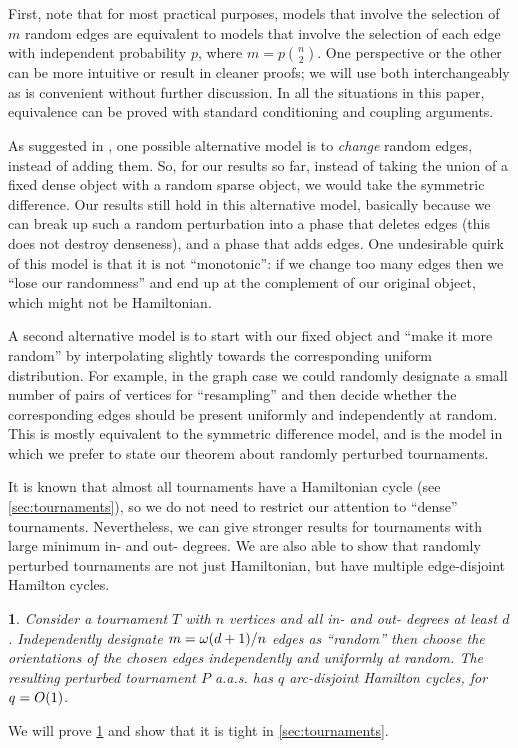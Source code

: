 \documentclass[11pt,english]{article}
\theoremstyle{plain}
\newtheorem{thm}{\protect\theoremname}
\theoremstyle{definition}
\theoremstyle{definition}
\theoremstyle{plain}
\theoremstyle{plain}
\theoremstyle{plain}
\theoremstyle{plain}
\theoremstyle{remark}
\theoremstyle{remark}
\let\originalleft\left
\let\originalright\right
\renewcommand{\left}{\mathopen{}\mathclose\bgroup\originalleft}
\renewcommand{\right}{\aftergroup\egroup\originalright}
\providecommand{\theoremname}{Theorem}
\begin{document}
First, note that for most practical purposes, models that involve
the selection of $m$ random edges are equivalent to models that involve
the selection of each edge with independent probability $p$, where
$m=p{n \choose 2}$. One perspective or the other can be more intuitive
or result in cleaner proofs; we will use both interchangeably as is
convenient without further discussion. In all the situations in this
paper, equivalence can be proved with standard conditioning and coupling
arguments.

As suggested in \cite[Definition~1]{ST03}, one possible alternative
model is to \emph{change} random edges, instead of adding them. So,
for our results so far, instead of taking the union of a fixed dense
object with a random sparse object, we would take the symmetric difference.
Our results still hold in this alternative model, basically because
we can break up such a random perturbation into a phase that deletes
edges (this does not destroy denseness), and a phase that adds edges.
One undesirable quirk of this model is that it is not ``monotonic'':
if we change too many edges then we ``lose our randomness'' and
end up at the complement of our original object, which might not be
Hamiltonian.

A second alternative model is to start with our fixed object and ``make
it more random'' by interpolating slightly towards the corresponding
uniform distribution. For example, in the graph case we could randomly
designate a small number of pairs of vertices for ``resampling''
and then decide whether the corresponding edges should be present
uniformly and independently at random. This is mostly equivalent to
the symmetric difference model, and is the model in which we prefer
to state our theorem about randomly perturbed tournaments.

It is known that almost all tournaments have a Hamiltonian cycle (see
\ref{sec:tournaments}), so we do not need to restrict our attention
to ``dense'' tournaments. Nevertheless, we can give stronger results
for tournaments with large minimum in- and out- degrees. We are also
able to show that randomly perturbed tournaments are not just Hamiltonian,
but have multiple edge-disjoint Hamilton cycles.
\begin{thm}
\label{thm:tournament}Consider a tournament $T$ with $n$ vertices
and all in- and out- degrees at least $d$. Independently designate
$m=\omega\left(d+1\right)/n$ edges as ``random'' then choose the
orientations of the chosen edges independently and uniformly at random.
The resulting perturbed tournament $P$ a.a.s. has $q$ arc-disjoint
Hamilton cycles, for $q=O\left(1\right)$.
\end{thm}
We will prove \ref{thm:tournament} and show that it is tight in \ref{sec:tournaments}.
\end{document}
